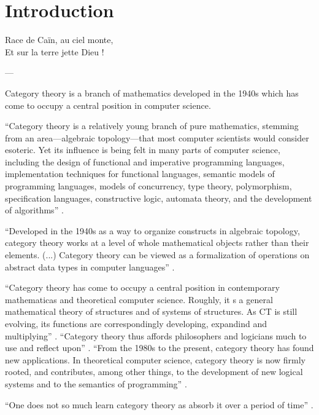 \chapter{Introduction}

\epigraph{
  Race de Caïn, au ciel monte,\\
  Et sur la terre jette Dieu !
}{---\textcite[16]{baudelaire-1857}}


Category theory is a branch of mathematics developed in the 1940s
which has come to occupy a central position in computer science.


``Category theory is a relatively young branch of pure mathematics,
stemming from an area---algebraic topology---that most computer
scientists would consider esoteric. Yet its influence is being felt in
many parts of computer science, including the design of functional and
imperative programming languages, implementation techniques for
functional languages, semantic models of programming languages, models
of concurrency, type theory, polymorphism, specification languages,
constructive logic, automata theory, and the development of
algorithms'' \parencite[xi]{pierce-1991}.


``Developed in the 1940s as a way to organize constructs in algebraic
topology, category theory works at a level of whole mathematical
objects rather than their elements. (...) Category theory can be
viewed as a formalization of operations on abstract data types in
computer languages'' \parencite[1154]{wolfram-2002}.

``Category theory has come to occupy a central position in
contemporary mathematicas and theoretical computer science. Roughly,
it s a general mathematical theory of structures and of systems of
structures. As CT is still evolving, its functions are correspondingly
developing, expandind and multiplying'' \parencite[1]{marquis-2013}.
``Category theory thus affords philosophers and logicians much to use
and reflect upon'' \parencite[1]{marquis-2013}. ``From the 1980s to
the present, category theory has found new applications. In
theoretical computer science, category theory is now firmly rooted,
and contributes, among other things, to the development of new logical
systems and to the semantics of programming''
\parencite[23]{marquis-2013}.








``One does not so much learn category theory as absorb it over a
period of time'' \parencite[26]{bird-demoor-1997}.

